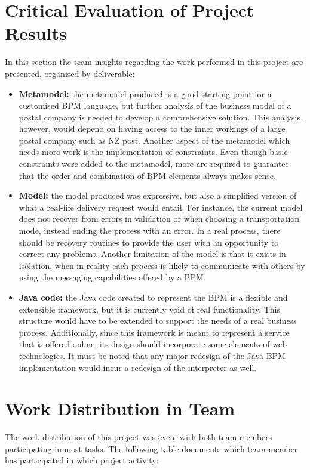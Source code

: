 \documentclass[11pt, a4paper, oneside, openright]{article}
\begin{document}
\section{Critical Evaluation of Project Results}
In this section the team insights regarding the work performed in this project
are presented, organised by deliverable:

\begin{itemize}
  \item \textbf{Metamodel:} the metamodel produced is a good starting point for a
  customised BPM language, but further analysis of the business model of a
  postal company is needed to develop a comprehensive solution. This analysis, however,
  would depend on having access to the inner workings of a large postal company
  such as NZ post. Another aspect of the metamodel which needs more work is the
  implementation of constraints. Even though basic constraints were added to the
  metamodel, more are required to guarantee that the order and combination
  of BPM elements always makes sense.
  \item \textbf{Model:} the model produced was expressive, but also a simplified version
  of what a real-life delivery request would entail. For instance, the current
  model does not recover from errors in validation or when choosing a
  transportation mode, instead ending the process with an error. In a real process,
  there should be recovery routines to provide the user with an opportunity to
  correct any problems. Another limitation of the model is that it exists in
  isolation, when in reality each process is likely to communicate with others
  by using the messaging capabilities offered by a BPM.
  \item \textbf{Java code:} the Java code created to represent the BPM is a flexible and
  extensible framework, but it is currently void of real functionality. This structure
  would have to be extended to support the needs of a
  real business process. Additionally, since this framework is meant to
  represent a service that is offered online, its design should incorporate some
  elements of web technologies. It must be noted that any major redesign of
  the Java BPM implementation would incur a redesign of the
  interpreter as well.
\end{itemize}

\section{Work Distribution in Team}
The work distribution of this project was even, with both team members
participating in most tasks. The following table documents which team member has
participated in which project activity:
\end{document}
